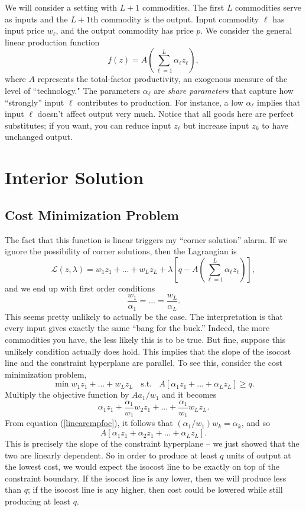 \documentclass[12pt]{article}
\theoremstyle{definition}
\begin{document}
\maketitle
\singlespace
We will consider a setting with $L+1$ commodities. The first $L$ commodities serve as inputs and the $L+1$th commodity is the output. Input commodity $\ell$ has input price $w_{\ell}$, and the output commodity has price $p$. We consider the general linear production function
	\[	f(z)=A \left(\sum_{\ell = 1}^L \alpha_{\ell} z_{\ell} \right),\]
where $A$ represents the total-factor productivity, an exogenous measure of the level of ``technology." The parameters $\alpha_{\ell}$ are \emph{share parameters} that capture how ``strongly'' input $\ell$ contributes to production. For instance, a low $\alpha_{\ell}$ implies that input $\ell$ doesn't affect output very much. Notice that all goods here are perfect substitutes; if you want, you can reduce input $z_{\ell}$ but increase input $z_{k}$ to have unchanged output. 



\section{Interior Solution}

\subsection{Cost Minimization Problem}
The fact that this function is linear triggers my ``corner solution'' alarm. If we ignore the possibility of corner solutions, then the Lagrangian is
	\[\mathcal{L}(z, \lambda) = w_1z_1 + ... + w_Lz_L + \lambda \left[ q - A \left(\sum_{\ell = 1}^L \alpha_{\ell} z_{\ell} \right) \right],	\]
and we end up with first order conditions
\begin{equation} \label{linearcmpfoc}
	\frac{w_1}{ \alpha_1} = ... = \frac{w_L}{ \alpha_L}.	
\end{equation}
This seems pretty unlikely to actually be the case. The interpretation is that every input gives exactly the same ``bang for the buck.''  Indeed, the more commodities you have, the less likely this is to be true. But fine, suppose this unlikely condition actually does hold. This implies that the slope of the isocost line and the constraint hyperplane are parallel. To see this, consider the cost minimization problem,
	\[ \min w_1 z_1 + ... + w_Lz_L \;\; \text{ s.t. } \;\; A[\alpha_1 z_1 + ... + \alpha_L z_L] \geq q.	\]
	Multiply the objective function by $A a_1 / w_1$ and it becomes
	\[\alpha_1 z_1 + \frac{\alpha_1}{w_1}w_2 z_1 + ... + \frac{\alpha_1}{w_1}w_Lz_L. \]
From equation (\ref{linearcmpfoc}), it follows that $(\alpha_1/w_1)w_k=\alpha_k$, and so
	\[A[\alpha_1 z_1 + \alpha_2 z_1 + ... + \alpha_L z_L]. \]
This is precisely the slope of the constraint hyperplane -- we just showed that the two are linearly dependent. So in order to produce at least $q$ units of output at the lowest cost, we would expect the isocost line to be exactly on top of the constraint boundary. If the isocost line is any lower, then we will produce less than $q$; if the isocost line is any higher, then cost could be lowered while still producing at least $q$. 
	
\end{document}
